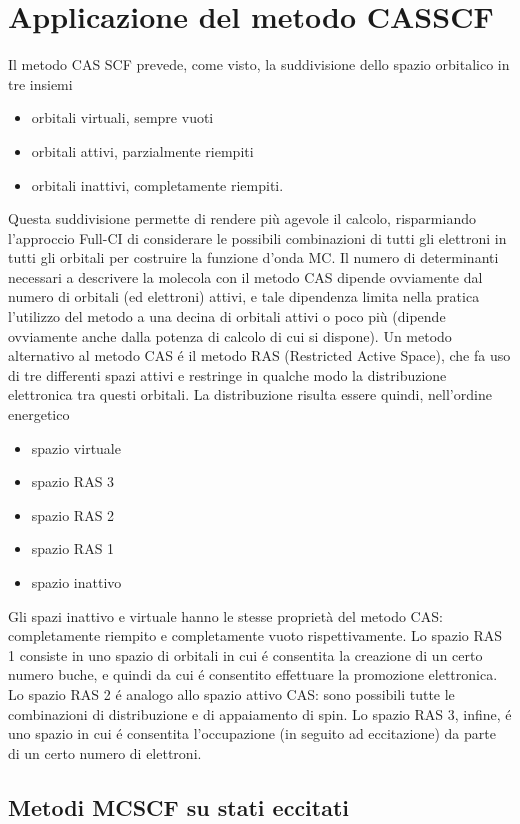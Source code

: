 \section{Applicazione del metodo CASSCF}

Il metodo CAS SCF prevede, come visto, la suddivisione dello spazio
orbitalico in tre insiemi
\begin{itemize}
\item orbitali virtuali, sempre vuoti
\item orbitali attivi, parzialmente riempiti
\item orbitali inattivi, completamente riempiti.
\end{itemize}
Questa suddivisione permette di rendere pi\`u agevole il calcolo,
risparmiando l'approccio Full-CI di considerare le possibili
combinazioni di tutti gli elettroni in tutti gli orbitali per costruire
la funzione d'onda MC.
Il numero di determinanti necessari a descrivere la molecola con il
metodo CAS dipende ovviamente dal numero di orbitali (ed elettroni)
attivi, e tale dipendenza limita nella pratica l'utilizzo del metodo a 
una decina di orbitali attivi o poco pi\`u (dipende ovviamente anche dalla
potenza di calcolo di cui si dispone).
Un metodo alternativo al metodo CAS \'e il metodo RAS (Restricted Active
Space), che fa uso di tre differenti spazi attivi e restringe in qualche
modo la distribuzione elettronica tra questi orbitali. La distribuzione
risulta essere quindi, nell'ordine energetico
\begin{itemize}
\item spazio virtuale
\item spazio RAS 3
\item spazio RAS 2
\item spazio RAS 1
\item spazio inattivo
\end{itemize}

Gli spazi inattivo e virtuale hanno le stesse propriet\`a del metodo CAS:
completamente riempito e completamente vuoto rispettivamente.
Lo spazio RAS 1 consiste in uno spazio di orbitali in cui \'e consentita
la creazione di un certo numero buche, e quindi da cui \'e consentito
effettuare la promozione elettronica.
Lo spazio RAS 2 \'e analogo allo spazio attivo CAS: sono possibili tutte
le combinazioni di distribuzione e di appaiamento di spin.
Lo spazio RAS 3, infine, \'e uno spazio in cui \'e consentita
l'occupazione (in seguito ad eccitazione) da parte di un certo numero 
di elettroni.

\subsection{Metodi MCSCF su stati eccitati}

